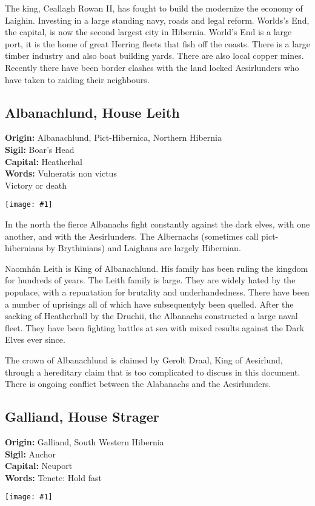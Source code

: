 \documentclass[a4paper]{dnd5}
\newcommand\inc[1]{
 \begin{center}\texttt{[image: \#1]}\end{center}
}
\newcommand\origin{\textbf{Origin: }}
\newcommand\sigil{\textbf{Sigil: }}
\newcommand\words{\textbf{Words: }}
\newcommand\wordsii{\hspace*{4em}}
\newcommand\capital{\textbf{Capital: }}
\begin{document}
The king, Ceallagh Rowan II, has fought to build the modernize the economy of Laighin.  Investing in a large standing navy, roads and legal reform.  Worlds's End, the capital, is now the second largest city in Hibernia.  World's End is a large port, it is the home of great Herring fleets that fish off the coasts.  There is a large timber industry and also boat building yards.  There are also local copper mines.   Recently there have been border clashes with the land locked Aesirlunders who have taken to raiding their neighbours.

\subsection{Albanachlund, House Leith}
\origin Albanachlund, Pict-Hibernica, Northern Hibernia\\
\sigil Boar's Head\\
\capital Heatherhal\\
\words Vulneratis non victus\\
\wordsii Victory or death\\
\inc{leith.png}

In the north the fierce Albanachs fight constantly against the dark elves, with one another, and with the Aesirlunders.  The Albernachs (sometimes call pict-hibernians by Brythinians) and Laighans are largely Hibernian. 

Naomhán Leith is King of Albanachlund.  His family has been ruling the kingdom for hundreds of years.  The Leith family is large.  They are widely hated by the populace, with a repuatation for brutality and underhandedness.  There have been a number of uprisings all of which have subsequentyly been quelled.  After the sacking of Heatherhall by the Druchii, the Albanachs constructed a large naval fleet.  They have been fighting battles at sea with mixed results against the Dark Elves ever since.

The crown of Albanachlund is claimed by Gerolt Draal, King of Aesirlund, through a hereditary claim that is too complicated to discuss in this document.  There is ongoing conflict between the Alabanachs and the Aesirlunders.

\subsection{Galliand, House Strager}
\origin Galliand, South Western Hibernia\\
\sigil Anchor\\
\capital Neuport\\
\words Tenete: Hold fast\\
\inc{strager.png}
\end{document}
